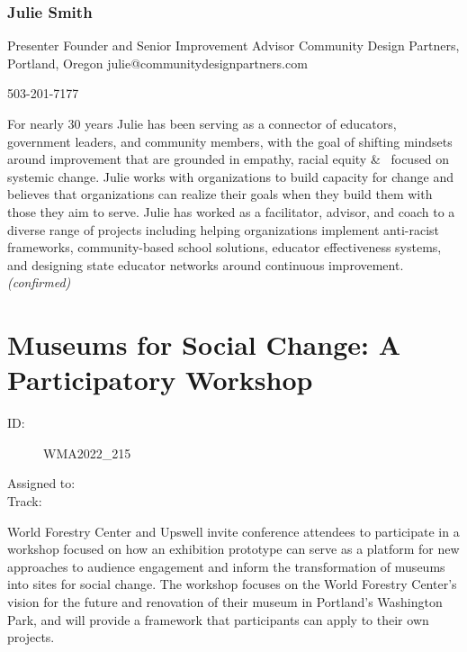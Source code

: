 \documentclass{report}
\begin{document}
              
                \subsubsection*{ Julie Smith }
                Presenter\newline
                Founder and Senior Improvement Advisor\newline
                Community Design Partners, Portland, Oregon
                \newline
                julie@communitydesignpartners.com\newline
                
                503-201-7177\newline

                For nearly 30 years Julie has been serving as a connector of educators, government leaders, and community members, with the goal of shifting mindsets around improvement that are grounded in empathy, racial equity \&  focused on systemic change. Julie works with organizations to build capacity for change and believes that organizations can realize their goals when they build them with those they aim to serve. Julie has worked as a facilitator, advisor, and coach to a diverse range of projects including helping organizations implement anti-racist frameworks, community-based school solutions, educator effectiveness systems, and designing state educator networks around continuous improvement.
                \emph{ (confirmed) }
              

              

              

              
        
          \newpage
          \section{ Museums for Social Change: A Participatory Workshop }
            \begin{description}
              \item [ID:]
              WMA2022\_215

              \item [Assigned to:]
                \item [Track:]
              \end{description}

              World Forestry Center and Upswell invite conference attendees to participate in a workshop focused on how an exhibition prototype can serve as a platform for new approaches to audience engagement and inform the transformation of museums into sites for social change.
The workshop focuses on the World Forestry Center’s vision for the future and renovation of their museum in Portland’s Washington Park, and will provide a framework that participants can apply to their own projects.
\end{document}
